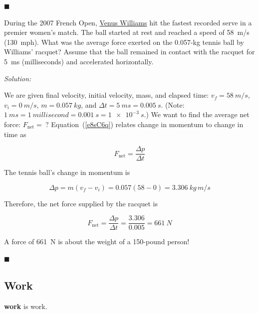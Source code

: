 \documentclass[dvipsnames]{article}
\begin{document}
\hfill $\blacksquare$

\begin{example}
During the 2007 French Open, \href{https://youtu.be/6b1NSgQZvdo}{Venus Williams} hit the fastest recorded serve in a premier women's match. The ball started at rest and reached a speed of \SI{58}{m/s} (\SI{130}{mph}). What was the average force exerted on the 0.057-kg tennis ball by Williams' racquet? Assume that the ball remained in contact with the racquet for \SI{5}{ms} (milliseconds) and accelerated horizontally.
\end{example}

\textit{Solution:} 

We are given final velocity, initial velocity, mass, and elapsed time: $v_f = \SI{58}{m/s}$, $v_i = \SI{0}{m/s}$, $m = \SI{0.057}{kg}$, and $\Delta t = \SI{5}{ms} = \SI{0.005}{s}$. (Note: $\SI{1}{ms} = \SI{1}{millisecond} = \SI{0.001}{s} = \SI{1e-3}{s}$.) We want to find the average net force: $F_{\text{net}} =\ ?$ Equation~(\ref{e8sC6q}) relates change in momentum to change in time as

\begin{equation*}
    F_{\text{net}} = \frac{\Delta p}{\Delta t}
\end{equation*}

The tennis ball's change in momentum is

\begin{equation*}
    \Delta p = m(v_f - v_i) = 0.057(58 - 0) = \SI{3.306}{kg\,m/s}
\end{equation*}

Therefore, the net force supplied by the racquet is

\begin{equation*}
    F_{\text{net}} = \frac{\Delta p}{\Delta t} = \frac{3.306}{0.005} = \SI{661}{N}
\end{equation*}
\vspace{0.1ex}

A force of \SI{661}{N} is about the weight of a 150-pound person!

\hfill $\blacksquare$


\subsection{Work}



\textbf{\Gls{work}} is \glsdesc{work}.

\end{document}
